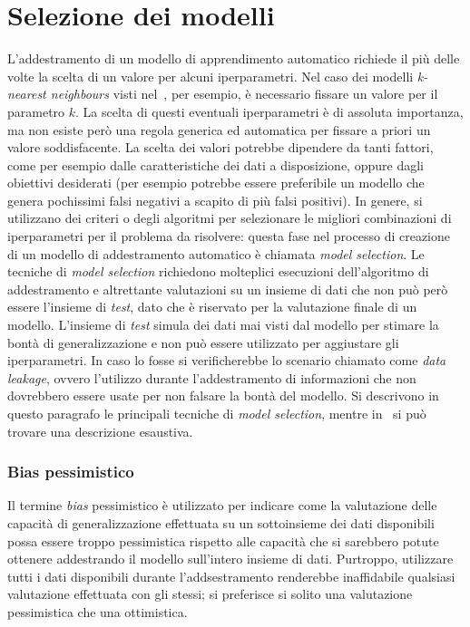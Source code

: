 \section{Selezione dei modelli}\label{sec:model_selection}
L'addestramento di un modello di apprendimento automatico richiede il più delle volte la scelta di un valore per alcuni iperparametri. 
Nel caso dei modelli \emph{k-nearest neighbours} visti nel~, per esempio, è necessario fissare un valore per il parametro $k$. 
La scelta di questi eventuali iperparametri è di assoluta importanza, ma non esiste però una regola generica ed automatica per fissare a priori un valore soddisfacente. La scelta dei valori potrebbe dipendere da tanti fattori, come per esempio dalle caratteristiche dei dati a disposizione, oppure dagli obiettivi desiderati (per esempio potrebbe essere preferibile un modello che genera pochissimi falsi negativi a scapito di più falsi positivi).
In genere, si utilizzano dei criteri o degli algoritmi per selezionare le migliori combinazioni di iperparametri per il problema da risolvere: questa fase nel processo di creazione di un modello di addestramento automatico è chiamata \emph{model selection}.
Le tecniche di \emph{model selection} richiedono molteplici esecuzioni dell'algoritmo di addestramento e altrettante valutazioni su un insieme di dati che non può però essere l'insieme di \emph{test}, dato che è riservato per la valutazione finale di un modello. 
L'insieme di \emph{test} simula dei dati mai visti dal modello per stimare la bontà di generalizzazione e non può essere utilizzato per aggiustare gli iperparametri.
In caso lo fosse si verificherebbe lo scenario chiamato come \emph{data leakage}, ovvero l'utilizzo durante l'addestramento di informazioni che non dovrebbero essere usate per non falsare la bontà del modello.
Si descrivono in questo paragrafo le principali tecniche di \emph{model selection}, mentre in~\cite{model_evaluation} si può trovare una descrizione esaustiva.
\subsubsection{Bias pessimistico} Il termine \emph{bias} pessimistico è utilizzato per indicare come la valutazione delle capacità di generalizzazione effettuata su un sottoinsieme dei dati disponibili possa essere troppo pessimistica rispetto alle capacità che si sarebbero potute ottenere addestrando il modello sull'intero insieme di dati.
Purtroppo, utilizzare tutti i dati disponibili durante l'addsestramento renderebbe inaffidabile qualsiasi valutazione effettuata con gli stessi; si preferisce si solito una valutazione pessimistica che una ottimistica.

